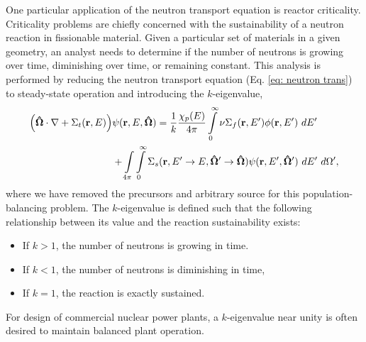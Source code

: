 One particular application of the neutron transport equation is reactor criticality.  Criticality problems are
chiefly concerned with the sustainability of a neutron reaction in fissionable material.  Given a particular
set of materials in a given geometry, an analyst needs to determine if the number of neutrons is growing over
time, diminishing over time, or remaining constant.  This analysis is performed by reducing the neutron
transport equation (Eq. \ref{eq: neutron trans}) to steady-state operation and introducing the $k$-eigenvalue,
\begin{align}\label{eq: neutron k}
  \qty(\mathbf{\hat\Omega}\cdot\nabla +
   \Sigma_t(\mathbf{r},E))&\psi(\mathbf{r},E,\mathbf{\hat\Omega}) =
   \frac{1}{k}\frac{\chi_p(E)}{4\pi}\int\limits_{0}^\infty \nu\Sigma_f(\mathbf{r},E')\phi(\mathbf{r},E')\ dE' \nonumber \\
  & + \int\limits_{4\pi}^{}\int\limits_{0}^\infty \Sigma_s(\mathbf{r},E'\to E,\mathbf{\hat\Omega'\to\hat\Omega})
  \psi(\mathbf{r},E',\mathbf{\hat\Omega'})  \ dE'\ d\Omega',
\end{align}
where we have removed the precursors and arbitrary source for this population-balancing problem.  The
$k$-eigenvalue is defined such that the following relationship between its value and the reaction
sustainability exists:
\begin{itemize}
  \item If $k > 1$, the number of neutrons is growing in time.
  \item If $k < 1$, the number of neutrons is diminishing in time,
  \item If $k = 1$, the reaction is exactly sustained.
\end{itemize}
For design of commercial nuclear power plants, a $k$-eigenvalue near unity is often desired to maintain balanced
plant operation.

